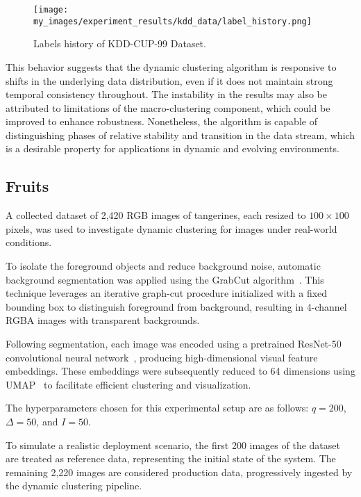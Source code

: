 \begin{figure}[H]
      \centering
      \texttt{[image: my\_images/experiment\_results/kdd\_data/label\_history.png]}
      \caption{Labels history of KDD-CUP-99 Dataset.}
      \label{fig:kdd_labels_history}
\end{figure}

This behavior suggests that the dynamic clustering algorithm is responsive to
shifts in the underlying data distribution, even if it does not maintain strong
temporal consistency throughout. The instability in the results may also be
attributed to limitations of the macro-clustering component, which could be
improved to enhance robustness. Nonetheless, the algorithm is capable of
distinguishing phases of relative stability and transition in the data stream,
which is a desirable property for applications in dynamic and evolving
environments.

\subsection{Fruits}\label{subsec:fruits}

A collected dataset of 2,420 RGB images of tangerines, each resized to $100
      \times 100$ pixels, was used to investigate dynamic clustering for images under
real-world conditions.

To isolate the foreground objects and reduce background noise, automatic
background segmentation was applied using the GrabCut algorithm~\cite{grabcut}.
This technique leverages an iterative graph-cut procedure initialized with a
fixed bounding box to distinguish foreground from background, resulting in
4-channel RGBA images with transparent backgrounds.

Following segmentation, each image was encoded using a pretrained ResNet-50
convolutional neural network~\cite{resnet}, producing high-dimensional visual
feature embeddings. These embeddings were subsequently reduced to 64 dimensions
using UMAP~\cite{umap} to facilitate efficient clustering and visualization.

The hyperparameters chosen for this experimental setup are as follows: $q =
      200$, $\Delta = 50$, and $I = 50$.

To simulate a realistic deployment scenario, the first 200 images of the
dataset are treated as reference data, representing the initial state of the
system. The remaining 2,220 images are considered production data,
progressively ingested by the dynamic clustering pipeline.

